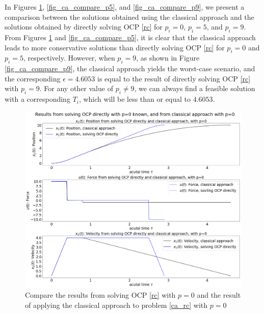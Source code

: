 \documentclass  [
  paper    = a4,
  BCOR     = 10mm,
  twoside,
  fontsize = 12pt,
  fleqn,
  toc      = bibnumbered,
  toc      = listofnumbered,
  numbers  = noendperiod,
  headings = normal,
  listof   = leveldown,
  version  = 3.03
]                                       {scrreprt}
\newcommand{\<}{\langle}
\renewcommand{\>}{\rangle}
\begin{document}
In Figures \ref{fig_ca_compare_p0}, \ref{fig_ca_compare_p5}, and \ref{fig_ca_compare_p9}, we present a comparison between the solutions obtained using the classical approach and the solutions obtained by directly solving OCP \ref{rc} for $p_i=0$, $p_i=5$, and $p_i=9$. From Figures \ref{fig_ca_compare_p0} and \ref{fig_ca_compare_p5}, it is clear that the classical approach leads to more conservative solutions than directly solving OCP \ref{rc} for $p_i=0$ and $p_i=5$, respectively. However, when $p_i=9$, as shown in Figure \ref{fig_ca_compare_p9}, the classical approach yields the worst-case scenario, and the corresponding $\epsilon=4.6053$ is equal to the result of directly solving OCP \ref{rc} with $p_i=9$. For any other value of $p_i \neq 9$, we can always find a feasible solution with a corresponding $T_i$, which will be less than or equal to $4.6053$.





\begin{figure}[H]
	\centerline{\includegraphics[width=12.5cm]{ca_compare_p0.png}}
	\caption{Compare the results from solving OCP \ref{rc} with $p=0$ and the result of applying the classical approach to problem \ref{ca_rc} with $p=0$}
	\label{fig_ca_compare_p0}
\end{figure}
\end{document}
